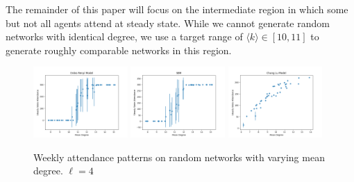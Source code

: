 \documentclass[12pt]{article}
\begin{document}
The remainder of this paper will focus on the intermediate region in which some but not all agents attend at steady state.  While we cannot generate random networks with identical degree, we use a target range of $\langle k \rangle \in [10, 11]$ to generate roughly comparable networks in this region.

\begin{figure}
  \includegraphics[width=0.32\textwidth]{erdos_renyi_degree.png}
  \includegraphics[width=0.32\textwidth]{sbm_degree.png}
  \includegraphics[width=0.32\textwidth]{chung_lu_degree.png}
  \caption{Weekly attendance patterns on random networks with varying mean degree.  $\ell = 4$}
\end{figure}
\end{document}
